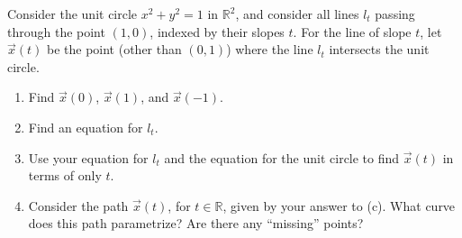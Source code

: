 \begin{problem}
Consider the unit circle $x^2+y^2=1$ in $\mathbb{R}^2$, and consider all lines $l_t$ passing through the point $(1,0)$, indexed by their slopes $t$. For the line of slope $t$, let $\vec{x}(t)$ be the point (other than $(0,1)$) where the line $l_t$ intersects the unit circle.
\begin{enumerate}
\item Find $\vec{x}(0)$, $\vec{x}(1)$, and $\vec{x}(-1)$.
\item Find an equation for $l_t$.
\item Use your equation for $l_t$ and the equation for the unit circle to find $\vec{x}(t)$ in terms of only $t$.
\item Consider the path $\vec{x}(t)$, for $t\in\mathbb{R}$, given by your answer to (c). What curve does this path parametrize? Are there any ``missing'' points?
\end{enumerate}
\end{problem}
